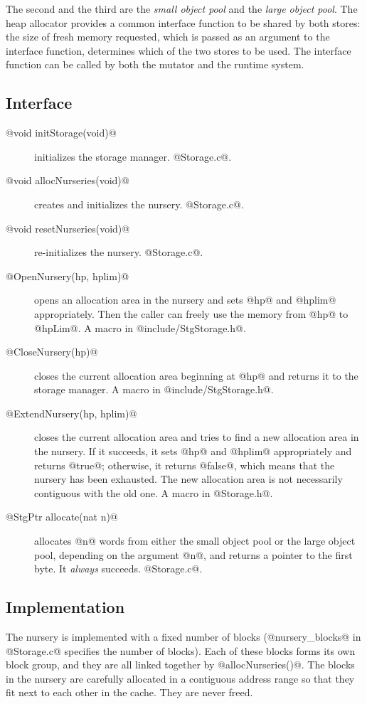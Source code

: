 \documentclass{article}
\begin{document}
The second and the third are the \emph{small object pool} and the
\emph{large object pool}.
The heap allocator provides a common interface function to be shared by both stores:
the size of fresh memory requested, which is passed as an argument to the 
interface function, determines which of the two stores to be used.
The interface function can be called by both the mutator and the runtime system.

\subsection{Interface}

\begin{description}
\item[@void initStorage(void)@] initializes the storage manager. @Storage.c@.
\item[@void allocNurseries(void)@] creates and initializes the nursery. 
@Storage.c@.
\item[@void resetNurseries(void)@] re-initializes the nursery. @Storage.c@.
\item[@OpenNursery(hp, hplim)@] opens an allocation area in the nursery and sets 
@hp@ and @hplim@ appropriately. 
Then the caller can freely use the memory from @hp@ to @hpLim@. 
A macro in @include/StgStorage.h@.
\item[@CloseNursery(hp)@] closes the current allocation area beginning at @hp@
and returns it to the storage manager.
A macro in @include/StgStorage.h@.
\item[@ExtendNursery(hp, hplim)@] closes the current allocation area and 
tries to find a new allocation area in the nursery. 
If it succeeds, it sets @hp@ and @hplim@ appropriately and returns @true@; 
otherwise, it returns @false@,
which means that the nursery has been exhausted. 
The new allocation area is not necessarily contiguous with the old one.
A macro in @Storage.h@.
\item[@StgPtr allocate(nat n)@] allocates @n@ words from either the small
object pool or the large object pool, depending on the argument @n@, 
and returns a pointer to the first byte. It \emph{always} succeeds.
@Storage.c@.
\end{description}

\subsection{Implementation}

The nursery is implemented with a fixed number of blocks (@nursery_blocks@
in @Storage.c@ specifies the number of blocks). 
Each of these blocks forms its own block group, and they are all linked together
by @allocNurseries()@. 
The blocks in the nursery are carefully allocated in a contiguous address
range so that they fit next to each other in the cache.
They are never freed. 
\end{document}
